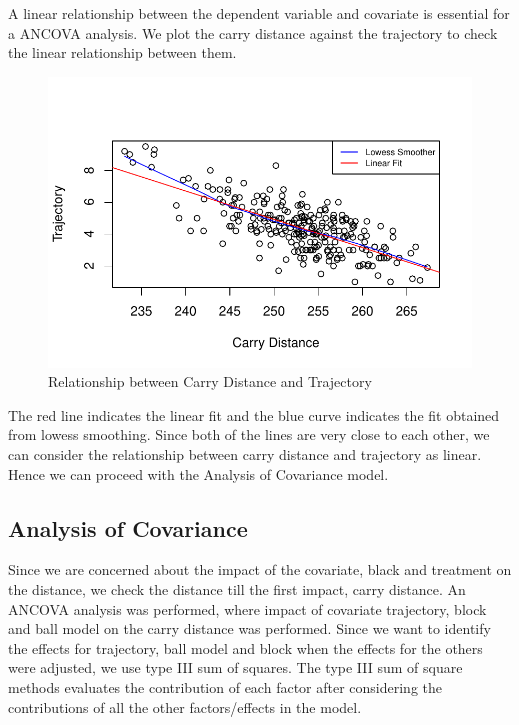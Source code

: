 \documentclass{article}\usepackage[]{graphicx}\usepackage[]{color}
\makeatletter
\def\maxwidth{ %
  \ifdim\Gin@nat@width>\linewidth
    \linewidth
  \else
    \Gin@nat@width
  \fi
}
\newenvironment{knitrout}{}{} %
\makeatother
\begin{document}
A linear relationship between the dependent variable and covariate is essential for a ANCOVA analysis. We plot the carry distance against the trajectory to check the linear relationship between them.

\begin{figure}[ht]
\centering
\begin{knitrout}
\color{fgcolor}
\includegraphics[width=\maxwidth]{figure/linearity_of_variables-1} 

\end{knitrout}
\caption{Relationship between Carry Distance and Trajectory}
\label{Relationship between covariate and Response}
\end{figure}
The red line indicates the linear fit and the blue curve indicates the fit obtained from lowess smoothing. Since both of the lines are very close to each other, we can consider the relationship between carry distance and trajectory as linear. Hence we can proceed with the Analysis of Covariance model.


\subsection*{Analysis of Covariance}

Since we are concerned about the impact of the covariate, black and treatment on the distance, we check the distance till the first impact, carry distance. An ANCOVA analysis was performed, where impact of covariate trajectory, block and ball model on the carry distance was performed. Since we want to identify the effects for trajectory, ball model and block when the effects for the others were adjusted, we use type III sum of squares. The type III sum of square methods evaluates the contribution of each factor after considering the contributions of all the other factors/effects in the model.
\end{document}
